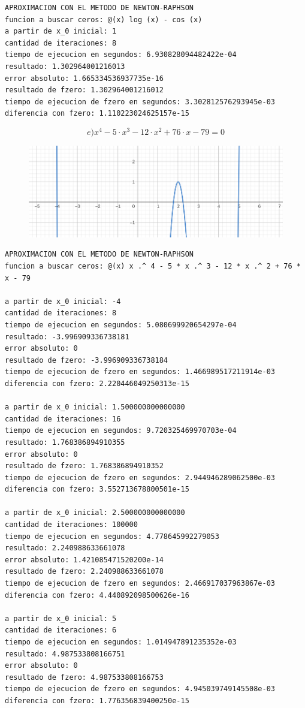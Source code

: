 \documentclass{article}
\begin{document}
\begin{lstlisting}
APROXIMACION CON EL METODO DE NEWTON-RAPHSON
funcion a buscar ceros: @(x) log (x) - cos (x)
a partir de x_0 inicial: 1
cantidad de iteraciones: 8
tiempo de ejecucion en segundos: 6.930828094482422e-04
resultado: 1.302964001216013
error absoluto: 1.665334536937735e-16
resultado de fzero: 1.302964001216012
tiempo de ejecucion de fzero en segundos: 3.302812576293945e-03
diferencia con fzero: 1.110223024625157e-15
\end{lstlisting}

\vspace{10cm}

\[e) x^4 - 5 \cdot x^3 - 12 \cdot x^2 +76 \cdot x -79 = 0\]
\begin{figure}[H]
    \centering
    \includegraphics[width=0.7\linewidth]{e.png}
    \label{fig:enter-label}
    \caption{}
\end{figure}

\begin{lstlisting}
APROXIMACION CON EL METODO DE NEWTON-RAPHSON
funcion a buscar ceros: @(x) x .^ 4 - 5 * x .^ 3 - 12 * x .^ 2 + 76 * x - 79

a partir de x_0 inicial: -4
cantidad de iteraciones: 8
tiempo de ejecucion en segundos: 5.080699920654297e-04
resultado: -3.996909336738181
error absoluto: 0
resultado de fzero: -3.996909336738184
tiempo de ejecucion de fzero en segundos: 1.466989517211914e-03
diferencia con fzero: 2.220446049250313e-15

a partir de x_0 inicial: 1.500000000000000
cantidad de iteraciones: 16
tiempo de ejecucion en segundos: 9.720325469970703e-04
resultado: 1.768386894910355
error absoluto: 0
resultado de fzero: 1.768386894910352
tiempo de ejecucion de fzero en segundos: 2.944946289062500e-03
diferencia con fzero: 3.552713678800501e-15

a partir de x_0 inicial: 2.500000000000000
cantidad de iteraciones: 100000
tiempo de ejecucion en segundos: 4.778645992279053
resultado: 2.240988633661078
error absoluto: 1.421085471520200e-14
resultado de fzero: 2.240988633661078
tiempo de ejecucion de fzero en segundos: 2.466917037963867e-03
diferencia con fzero: 4.440892098500626e-16

a partir de x_0 inicial: 5
cantidad de iteraciones: 6
tiempo de ejecucion en segundos: 1.014947891235352e-03
resultado: 4.987533808166751
error absoluto: 0
resultado de fzero: 4.987533808166753
tiempo de ejecucion de fzero en segundos: 4.945039749145508e-03
diferencia con fzero: 1.776356839400250e-15
\end{lstlisting}
\end{document}
